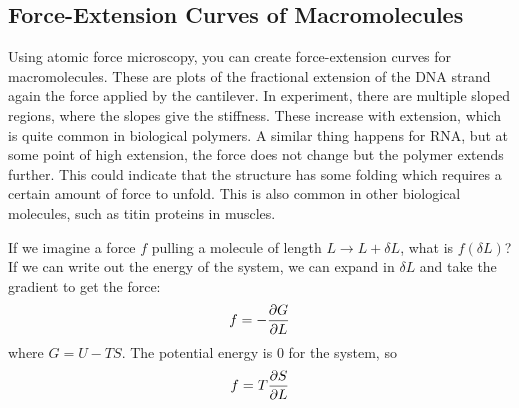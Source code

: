 \documentclass[a4paper,twoside,master.tex]{subfiles}
\begin{document}
\subsection{Force-Extension Curves of Macromolecules}\label{sub:force-extension_curves_of_macromolecules}

Using atomic force microscopy, you can create force-extension curves for macromolecules. These are plots of the fractional extension of the DNA strand again the force applied by the cantilever. In experiment, there are multiple sloped regions, where the slopes give the stiffness. These increase with extension, which is quite common in biological polymers. A similar thing happens for RNA, but at some point of high extension, the force does not change but the polymer extends further. This could indicate that the structure has some folding which requires a certain amount of force to unfold. This is also common in other biological molecules, such as titin proteins in muscles.

If we imagine a force $ f $ pulling a molecule of length $ L \to L + \delta L $, what is $ f(\delta L) $? If we can write out the energy of the system, we can expand in $ \delta L $ and take the gradient to get the force:
\begin{equation}
    f = - \pdv{G}{L}
\end{equation}
where $ G = U - TS $. The potential energy is $ 0 $ for the system, so
\begin{equation}
    f = T \pdv{S}{L}
\end{equation}
\end{document}
